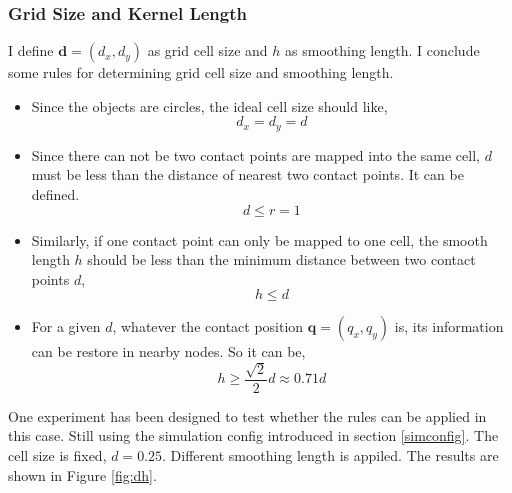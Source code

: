     \subsubsection{Grid Size and Kernel Length}
    I define $\pmb{d}=(d_x, d_y)$ as grid cell size and $h$ as smoothing length. I conclude some rules for determining grid cell size and smoothing length. 
    \begin{itemize}
        \item Since the objects are circles, the ideal cell size should like,
            $$d_x = d_y = d $$ 
        \item Since there can not be two contact points are mapped into the same cell, $d$ must be less than the distance of nearest two contact points. It can be defined.
            $$d \le r = 1$$
        \item Similarly, if one contact point can only be mapped to one cell, the smooth length $h$ should be less than the minimum distance between two contact points $d$,
            $$h \le d$$  
        \item For a given $d$, whatever the contact position $\pmb{q}=(q_x, q_y)$ is, its information can be restore in nearby nodes. So it can be,
            $$h \ge \frac{\sqrt{2}}{2}d \approx 0.71 d$$
    \end{itemize}
    One experiment has been designed to test whether the rules can be applied in this case. Still using the simulation config introduced in section \ref{simconfig}. The cell size is fixed, $d=0.25$. Different smoothing length is appiled. The results are shown in Figure \ref{fig:dh}. \\

